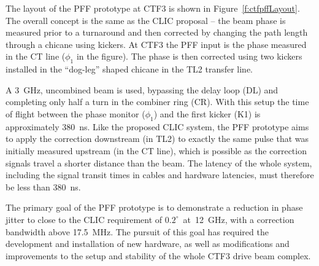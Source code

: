 

The layout of the PFF prototype at CTF3 is shown in Figure~\ref{f:ctfpffLayout}. The overall concept is the same as the CLIC proposal -- the beam phase is measured prior to a turnaround and then corrected by changing the path length through a chicane using kickers. At CTF3 the PFF input is the phase measured in the CT line (\(\phi_1\) in the figure). The phase is then corrected using two kickers installed in the ``dog-leg'' shaped chicane in the TL2 transfer line. 

A 3~GHz, uncombined beam is used, bypassing the delay loop (DL) and completing only half a turn in the combiner ring (CR). With this setup the time of flight between the phase monitor (\(\phi_1\)) and the first kicker (K1) is approximately 380~ns. Like the proposed CLIC system, the PFF prototype aims to apply the correction downstream (in TL2) to exactly the same pulse that was initially measured upstream (in the CT line), which is possible as the correction signals travel a shorter distance than the beam. The latency of the whole system, including the signal transit times in cables and hardware latencies, must therefore be less than 380~ns.

The primary goal of the PFF prototype is to demonstrate a reduction in phase jitter to close to the CLIC requirement of \(0.2^\circ\)~at~12~GHz, with a correction bandwidth above 17.5~MHz. The pursuit of this goal has required the development and installation of new hardware, as well as modifications and improvements to the setup and stability of the whole CTF3 drive beam complex.


